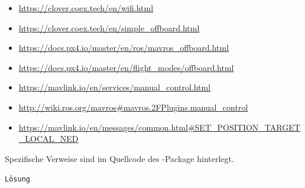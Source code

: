 \begin{itemize}
\item \href{https://clover.coex.tech/en/wifi.html}{https://clover.coex.tech/en/wifi.html}

\item \href{https://clover.coex.tech/en/simple\_offboard.html}{https://clover.coex.tech/en/simple\_offboard.html}
\item \href{https://docs.px4.io/master/en/ros/mavros\_offboard.html}{https://docs.px4.io/master/en/ros/mavros\_offboard.html}
\item \href{https://docs.px4.io/master/en/flight\_modes/offboard.html}{https://docs.px4.io/master/en/flight\_modes/offboard.html}

\item \href{https://mavlink.io/en/services/manual\_control.html}{https://mavlink.io/en/services/manual\_control.html}
\item \href{http://wiki.ros.org/mavros\#mavros.2FPlugins.manual\_control}{http://wiki.ros.org/mavros\#mavros.2FPlugins.manual\_control}

\item \href{https://mavlink.io/en/messages/common.html\#SET\_POSITION\_TARGET\_LOCAL\_NED}{https://mavlink.io/en/messages/common.html\#SET\_POSITION\_TARGET\_LOCAL\_NED}
\end{itemize}

Spezifische Verweise sind im Quellcode des \COEX-Package hinterlegt.












\missing[Hier anmerken, dass das Problem bisher nicht behoben wurde => Wirkt sich nur auf LED-Streifen aus.]








\texttt{Lösung}\\





